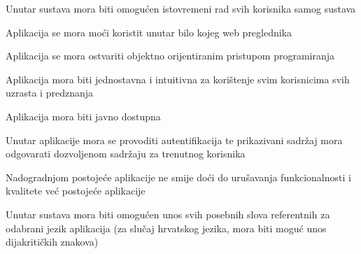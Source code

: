 			  \begin{packed_item}
			 	\item Unutar sustava mora biti omogućen istovremeni rad svih korisnika samog sustava
			 	\item Aplikacija se mora moći koristit unutar bilo kojeg web preglednika 
			 	\item Aplikacija se mora ostvariti objektno orijentiranim pristupom programiranja
			 	\item Aplikacija mora biti jednostavna i intuitivna za korištenje svim korisnicima svih uzrasta i predznanja
			 	\item Aplikacija mora biti javno dostupna
			 	\item Unutar aplikacije mora se provoditi autentifikacija te prikazivani sadržaj mora odgovarati dozvoljenom sadržaju za trenutnog korisnika
			 	\item Nadogradnjom postojeće aplikacije ne smije doći do urušavanja funkcionalnosti i kvalitete već postojeće aplikacije
			 	\item Unutar sustava mora biti omogućen unos svih posebnih slova referentnih za odabrani jezik aplikacija (za slučaj hrvatskog jezika, mora biti moguć unos dijakritičkih znakova)
			 \end{packed_item}
			 
			 
			 
	